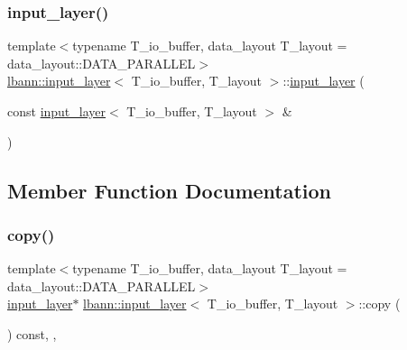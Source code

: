 \mbox{\label{classlbann_1_1input__layer_a5f009de9aa2d51c78cf28068218d8bb9}} 
\subsubsection{\texorpdfstring{input\+\_\+layer()}{input\_layer()}\hspace{0.1cm}{\footnotesize\ttfamily [2/2]}}
{\footnotesize\ttfamily template$<$typename T\+\_\+io\+\_\+buffer, data\+\_\+layout T\+\_\+layout = data\+\_\+layout\+::\+D\+A\+T\+A\+\_\+\+P\+A\+R\+A\+L\+L\+EL$>$ \\
\hyperlink{classlbann_1_1input__layer}{lbann\+::input\+\_\+layer}$<$ T\+\_\+io\+\_\+buffer, T\+\_\+layout $>$\+::\hyperlink{classlbann_1_1input__layer}{input\+\_\+layer} (\begin{DoxyParamCaption}\item[{const \hyperlink{classlbann_1_1input__layer}{input\+\_\+layer}$<$ T\+\_\+io\+\_\+buffer, T\+\_\+layout $>$ \&}]{ }\end{DoxyParamCaption})\hspace{0.3cm}{\ttfamily [default]}}



\subsection{Member Function Documentation}
\mbox{\label{classlbann_1_1input__layer_a02eb5e9b97c1da48997995cb89d297ec}} 
\subsubsection{\texorpdfstring{copy()}{copy()}}
{\footnotesize\ttfamily template$<$typename T\+\_\+io\+\_\+buffer, data\+\_\+layout T\+\_\+layout = data\+\_\+layout\+::\+D\+A\+T\+A\+\_\+\+P\+A\+R\+A\+L\+L\+EL$>$ \\
\hyperlink{classlbann_1_1input__layer}{input\+\_\+layer}$\ast$ \hyperlink{classlbann_1_1input__layer}{lbann\+::input\+\_\+layer}$<$ T\+\_\+io\+\_\+buffer, T\+\_\+layout $>$\+::copy (\begin{DoxyParamCaption}{ }\end{DoxyParamCaption}) const\hspace{0.3cm}{\ttfamily [inline]}, {\ttfamily [override]}, {\ttfamily [virtual]}}


